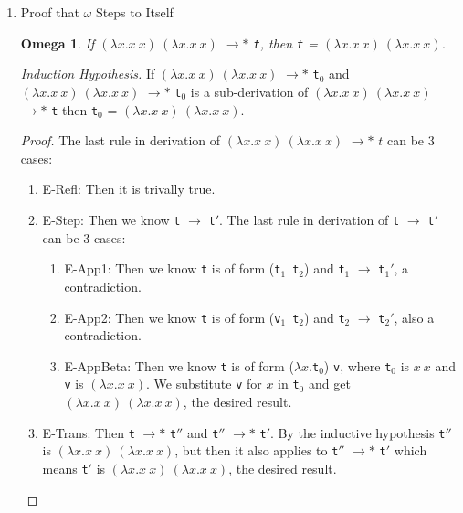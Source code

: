 \documentclass{article}
\newtheorem{omg}{Omega}
\begin{document}
\begin{enumerate}
  \item{Proof that $\omega$ Steps to Itself}
    \begin{omg} If $(\lambda x.x\ x)\ (\lambda x.x\ x)$ $\longrightarrow*$ \verb|t|, then \verb|t| = $(\lambda x.x\ x)\ (\lambda x.x\ x)$.
    \end{omg}

    \textit{Induction Hypothesis.} If $(\lambda x.x\ x)\ (\lambda x.x\ x)$ $\longrightarrow*$ \verb|t|$_0$ and $(\lambda x.x\ x)\ (\lambda x.x\ x)$ $\longrightarrow*$ \verb|t|$_0$ is a sub-derivation of $(\lambda x.x\ x)\ (\lambda x.x\ x)$ $\longrightarrow*$ \verb|t| then \verb|t|$_0$ = $(\lambda x.x\ x)\ (\lambda x.x\ x)$.

    \begin{proof}
      The last rule in derivation of $(\lambda x.x\ x)\ (\lambda x.x\ x)$ $\longrightarrow*$ $t$ can be 3 cases:
      \begin{enumerate}
      \item E-Refl: Then it is trivally true.

      \item E-Step:
        Then we know \verb|t| $\longrightarrow$ \verb|t|$'$.
        The last rule in derivation of \verb|t| $\longrightarrow$ \verb|t|$'$ can be 3 cases:
        \begin{enumerate}
          \item E-App1: Then we know \verb|t| is of form (\verb|t|$_1$\ \verb|t|$_2$) and \verb|t|$_1$ $\longrightarrow$ \verb|t|$_1'$, a contradiction.
          \item E-App2: Then we know \verb|t| is of form (\verb|v|$_1$\ \verb|t|$_2$) and \verb|t|$_2$ $\longrightarrow$ \verb|t|$_2'$, also a contradiction.
          \item E-AppBeta: Then we know \verb|t| is of form ($\lambda x.$\verb|t|$_0$) \verb|v|, where \verb|t|$_0$ is $x\ x$ and \verb|v| is $(\lambda x.x\ x)$. We substitute \verb|v| for $x$ in \verb|t|$_0$ and get $(\lambda x.x\ x)\ (\lambda x.x\ x)$, the desired result.
        \end{enumerate}

      \item E-Trans: Then \verb|t| $\longrightarrow *$ \verb|t|$''$ and \verb|t|$''$ $\longrightarrow *$ \verb|t|$'$. By the inductive hypothesis \verb|t|$''$ is $(\lambda x.x\ x)\ (\lambda x.x\ x)$, but then it also applies to \verb|t|$''$ $\longrightarrow *$ \verb|t|$'$ which means \verb|t|$'$ is $(\lambda x.x\ x)\ (\lambda x.x\ x)$, the desired result.


\end{enumerate}
\end{proof}
\end{enumerate}
\end{document}
